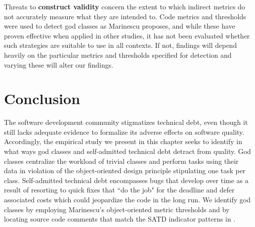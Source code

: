 Threats to \textbf{construct validity} concern the extent to which indirect metrics do not accurately measure what they are intended to. Code metrics and thresholds were used to detect god classes as Marinescu \cite{marinescu2004detection} proposes, and while these have proven effective when applied in other studies, it has not been evaluated whether such strategies are suitable to use in all contexts. If not, findings will depend heavily on the particular metrics and thresholds specified for detection and varying these will alter our findings.








\section{Conclusion}
\label{chap4:sec:conclusion}


The software development community stigmatizes technical debt, even though it still lacks adequate evidence to formalize its adverse effects on software quality. Accordingly, the empirical study we present in this chapter seeks to identify in what ways god classes and self-admitted technical debt detract from quality. God classes centralize the workload of trivial classes and perform tasks using their data in violation of the object-oriented design principle stipulating one task per class. Self-admitted technical debt encompasses bugs that develop over time as a result of resorting to quick fixes that ``do the job" for the deadline and defer associated costs which could jeopardize the code in the long run. We identify god classes by employing Marinescu's \cite{marinescu2004detection} object-oriented metric thresholds and \SATD by locating source code comments that match the SATD indicator patterns in \cite{ICSM_PotdarS14}.


